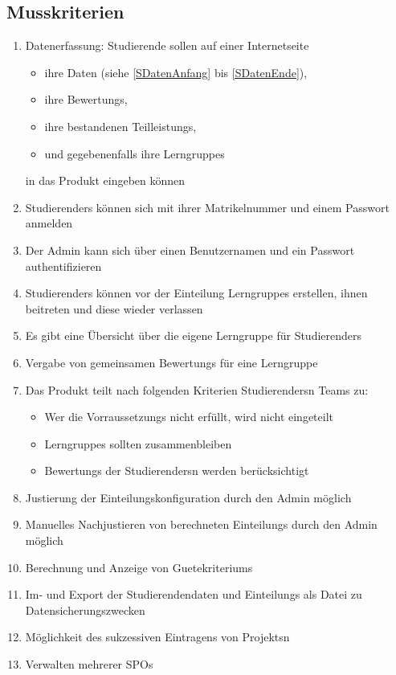 \documentclass[parskip=full]{scrartcl}
\newcommand{\swtLabel}[1]{\textbf{/#1\arabic*0/}}
\begin{document}
\subsection{Musskriterien}
 \begin{enumerate}[label=\swtLabel{M}]
   \item Datenerfassung: Studierende sollen auf einer Internetseite  
   \begin{itemize}
     \item ihre Daten (siehe \ref{SDatenAnfang} bis \ref{SDatenEnde}),     
     \item ihre \glspl{Bewertung}, 
     \item ihre bestandenen \glspl{Teilleistung},
     \item und gegebenenfalls ihre \glspl{Lerngruppe}
   \end{itemize}
   in das Produkt eingeben können
   \item \glspl{Studierender} können sich mit ihrer \gls{Matrikelnummer} und einem Passwort anmelden
   \item Der \gls{Admin} kann sich über einen \gls{Benutzername}n und ein Passwort authentifizieren
   \item \glspl{Studierender} können vor der \gls{Einteilung} \glspl{Lerngruppe} erstellen, ihnen beitreten und diese wieder verlassen
    \item Es gibt eine Übersicht über die eigene \gls{Lerngruppe} für
    \glspl{Studierender}
    \item Vergabe von gemeinsamen  \glspl{Bewertung} für eine \gls{Lerngruppe}
   \item Das Produkt teilt nach folgenden Kriterien \glspl{Studierender}n \glspl{Team} zu:
   \label{Mzuteilung}
   \begin{itemize}
     \item Wer die \glspl{Vorraussetzung} nicht erfüllt, wird nicht eingeteilt
     \item \glspl{Lerngruppe} sollten zusammenbleiben
     \item \glspl{Bewertung} der \glspl{Studierender}n werden berücksichtigt
   \end{itemize}
     \item Justierung der \gls{Einteilungskonfiguration} durch den \gls{Admin} möglich
   \item Manuelles Nachjustieren von berechneten \glspl{Einteilung} durch den \gls{Admin} möglich
   \item Berechnung und Anzeige von \glspl{Guetekriterium}
   \item Im- und Export der Studierendendaten und
   \glspl{Einteilung} als Datei zu Datensicherungszwecken
   \item Möglichkeit des sukzessiven Eintragens von \glspl{Projekt}n
   \item Verwalten mehrerer \glspl{SPO}
  
 \end{enumerate}
\end{document}
